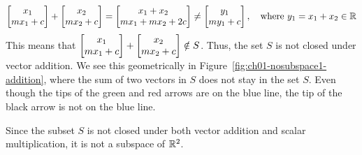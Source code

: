 \begin{boxedstuff}
\begin{example}
\begin{enumerate}
        \[ \bmxc x_1 \\ m x_1 + c\emx + \bmxc x_2 \\ m x_2 + c\emx = \bmxc x_1 + x_2 \\ m x_1 + m x_2 + 2c \emx \neq \bmxc y_1 \\ m y_1 + c\emx, \quad \text{where} \,\, y_1 = x_1 + x_2 \in \mb{R} \]
        This means that $\bmxc x_1 \\ m x_1 + c\emx + \bmxc x_2 \\ m x_2 + c\emx \notin S$. Thus, the set $S$ is not closed under vector addition. We see this geometrically in Figure~\ref{fig:ch01-nosubspace1-addition}, where the sum of two vectors in $S$ does not stay in the set $S$. Even though the tips of the green and red arrows are on the blue line, the tip of the black arrow is not on the blue line.
    \end{enumerate}
    Since the subset $S$ is not closed under both vector addition and scalar multiplication, it is not a subspace of $\mathbb{R}^2$.
    \label{example:nosubspace-straight-line}
\end{example}
\end{boxedstuff}
